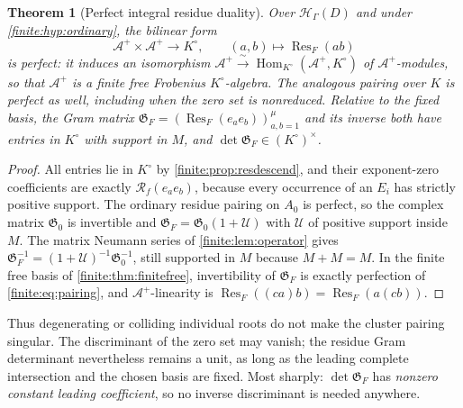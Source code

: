 \documentclass[11pt,letterpaper]{article}
\newtheorem{theorem}{Theorem}[section]
\theoremstyle{definition}
\theoremstyle{remark}
\newcommand{\HH}{\mathscr H}
\newcommand{\Alg}{\mathcal A}
\newcommand{\Kc}{K^{\circ}}
\newcommand{\Gram}{\mathfrak G}
\DeclareMathOperator{\Res}{Res}
\DeclareMathOperator{\Hom}{Hom}
\numberwithin{equation}{section}
\begin{document}
\begin{theorem}[Perfect integral residue duality]
\label{finite:thm:duality}
Over $\HH_\Gamma(D)$ and under \cref{finite:hyp:ordinary}, the bilinear form
\begin{equation}\label{finite:eq:pairing}
 \Alg^+\times\Alg^+\longrightarrow\Kc,
 \qquad (a,b)\longmapsto\Res_F(ab)
\end{equation}
is perfect: it induces an isomorphism $\Alg^+\xrightarrow{\ \sim\ }\Hom_{\Kc}(\Alg^+,\Kc)$ of $\Alg^+$-modules, so that $\Alg^+$ is a finite free Frobenius $\Kc$-algebra. The analogous pairing over $K$ is perfect as well, \emph{including} when the zero set is nonreduced. Relative to the fixed basis, the Gram matrix $\Gram_F=(\Res_F(e_ae_b))_{a,b=1}^\mu$ and its inverse both have entries in $\Kc$ with support in $M$, and $\det\Gram_F\in(\Kc)^\times$.
\end{theorem}

\begin{proof}
All entries lie in $\Kc$ by \cref{finite:prop:resdescend}, and their exponent-zero coefficients are exactly $\mathcal R_f(e_ae_b)$, because every occurrence of an $E_i$ has strictly positive support. The ordinary residue pairing on $A_0$ is perfect, so the complex matrix $\Gram_0$ is invertible and $\Gram_F=\Gram_0(1+\mathcal U)$ with $\mathcal U$ of positive support inside $M$. The matrix Neumann series of \cref{finite:lem:operator} gives $\Gram_F^{-1}=(1+\mathcal U)^{-1}\Gram_0^{-1}$, still supported in $M$ because $M+M=M$. In the finite free basis of \cref{finite:thm:finitefree}, invertibility of $\Gram_F$ is exactly perfection of \eqref{finite:eq:pairing}, and $\Alg^+$-linearity is $\Res_F((ca)b)=\Res_F(a(cb))$.
\end{proof}

Thus degenerating or colliding individual roots do not make the cluster pairing singular. The discriminant of the zero set may vanish; the residue Gram determinant nevertheless remains a unit, as long as the leading complete intersection and the chosen basis are fixed. Most sharply: $\det\Gram_F$ has \emph{nonzero constant leading coefficient}, so no inverse discriminant is needed anywhere.
\end{document}
